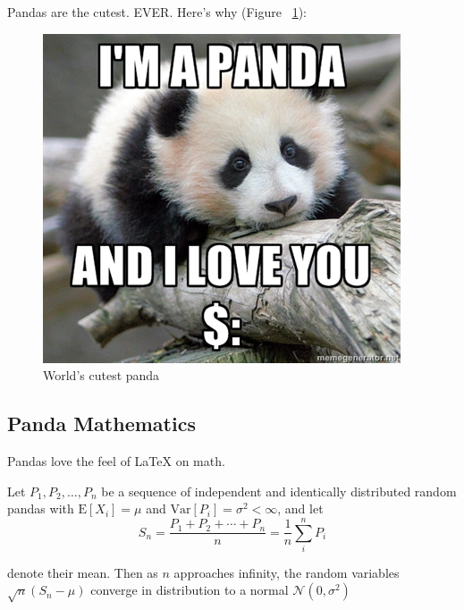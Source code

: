 \documentclass[11pt, oneside]{article}   	%
\begin{document}
Pandas are the cutest. EVER. Here's why (Figure ~\ref{fig:love_you_panda}):           %
\begin{figure}[h]                                         %
\begin{center}
\includegraphics[width=.8\textwidth]{love_you_panda.jpg}   %
\caption{\label{fig:love_you_panda} World's cutest panda}   %
\end{center}
\end{figure}


\subsection{Panda Mathematics}

Pandas love the feel of \LaTeX{} on math.

Let $P_1, P_2, \ldots, P_n$ be a sequence of independent and identically distributed random pandas with $\text{E}[X_i] = \mu$ and $\text{Var}[P_i] = \sigma^2 < \infty$, and let
$$S_n = \frac{P_1 + P_2 + \cdots + P_n}{n}
            = \frac{1}{n}\sum_{i}^{n} P_i$$

denote their mean. Then as $n$ approaches infinity, the random variables $\sqrt{n}(S_n - \mu)$ converge in distribution to a normal $\mathcal{N}(0, \sigma^2)$
\end{document}
